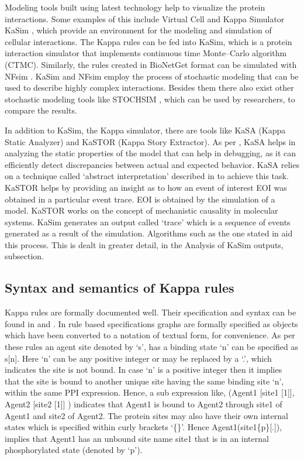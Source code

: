 \documentclass[msc,deptreport,ai]{infthesis}      %
\begin{document}
Modeling tools built using latest technology help to visualize the protein interactions. Some examples of this include Virtual Cell \cite{vcell} and Kappa Simulator KaSim \cite{kasim}, which provide an environment for the modeling and simulation of cellular interactions. The Kappa rules can be fed into KaSim, which is a protein interaction simulator that implements continuous time Monte–Carlo algorithm (CTMC). Similarly, the rules created in BioNetGet \cite{bioNetGen} format can be simulated with NFsim \cite{nfsim}. KaSim and NFsim employ the process of stochastic modeling that can be used to describe highly complex interactions. Besides them there also exist other stochastic modeling tools like STOCHSIM \cite{stochsim}, which can be used by researchers, to compare the results.

In addition to KaSim, the Kappa simulator, there are tools like KaSA (Kappa Static Analyzer) and KaSTOR (Kappa Story Extractor). As per \cite{kappaPlatform}, KaSA helps in analyzing the static properties of the model that can help in debugging, as it can efficiently detect discrepancies between actual and expected behavior. KaSA relies on a technique called `abstract interpretation' described in \cite{kappaPlatform} to achieve this task. KaSTOR helps by providing an insight as to how an event of interest EOI was obtained in a particular event trace. EOI is obtained by the simulation of a model. KaSTOR works on the concept of mechanistic causality in molecular systems. KaSim generates an output called `trace' which is a sequence of events generated as a result of the simulation. Algorithms such as the one stated in \cite{danos2012graphs} aid this process. This is dealt in greater detail, in the Analysis of KaSim outputs, subsection.

\subsection{Syntax and semantics of Kappa rules}
Kappa rules are formally documented well. Their specification and syntax can be found in \cite{kasim} and \cite{kappaURL}. In rule based specifications graphs are formally specified as objects which have been converted to a notation of textual form, for convenience. As per these rules an agent site denoted  by `s', has a binding state `n' can be specified as s[n]. Here `n' can be any positive integer or may be replaced by a `.', which indicates the site is not bound. In case `n' is a positive integer then it implies that the site is bound to another unique site having the same binding site `n', within the same PPI expression. Hence, a sub expression like, (Agent1 [site1 [1]], Agent2 [site2 [1]] ) indicates that Agent1 is bound to Agent2 through site1 of Agent1 and site2 of Agent2. The protein sites may also have their own internal states which is specified within curly brackets `\{\}'. Hence Agent1(site1\{p\}[.]), implies that Agent1 has an unbound site name site1 that is in an internal phosphorylated state (denoted by `p'). 
\end{document}
